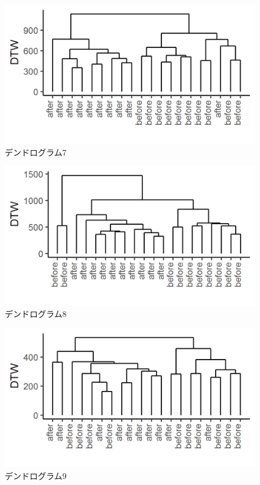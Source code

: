 \documentclass{jarticle}
\begin{document}
\begin{figure}[H]
	\begin{center}
		\includegraphics[width=15cm]{fig/dendro_7.png}
		\caption{デンドログラム7}
		\label{fig:dendro7}
	\end{center}
\end{figure}
\begin{figure}[H]
	\begin{center}
		\includegraphics[width=15cm]{fig/dendro_8.png}
		\caption{デンドログラム8}
		\label{fig:dendro8}
	\end{center}
\end{figure}
\begin{figure}[H]
	\begin{center}
		\includegraphics[width=15cm]{fig/dendro_9.png}
		\caption{デンドログラム9}
		\label{fig:dendro9}
	\end{center}
\end{figure}
\end{document}

